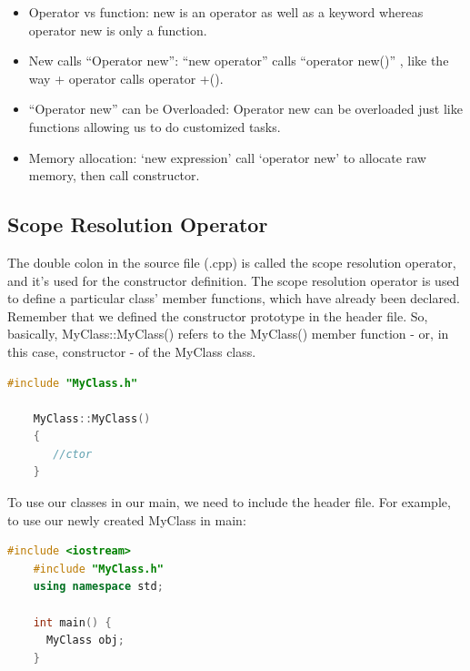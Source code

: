 \documentclass[12pt , a4paper]{article}
\begin{document}
	\begin{importantBox}
		\begin{itemize}
			\item Operator vs function: new is an operator as well as a keyword whereas operator new is only a function. \\
			\item New calls “Operator new”: “new operator” calls “operator new()” , like the way + operator calls operator +().\\
			\item “Operator new” can be Overloaded: Operator new can be overloaded just like functions allowing us to do customized tasks.\\
			\item Memory allocation: ‘new expression’ call ‘operator new’ to allocate raw memory, then call constructor.
		\end{itemize}
	\end{importantBox}
	\subsection{Scope Resolution Operator}
The double colon in the source file (.cpp) is called the scope resolution operator, and it's used for the constructor definition. The scope resolution operator is used to define a particular class' member functions, which have already been declared. Remember that we defined the constructor prototype in the header file. So, basically, MyClass::MyClass() refers to the MyClass() member function - or, in this case, constructor - of the MyClass class.
	\begin{lstlisting}[language=C++]
	#include "MyClass.h"
	
	MyClass::MyClass()
	{
	   //ctor
	}

	\end{lstlisting}
To use our classes in our main, we need to include the header file. For example, to use our newly created MyClass in main:
	\begin{lstlisting}[language=C++]
	#include <iostream>
	#include "MyClass.h"
	using namespace std;
	
	int main() {
	  MyClass obj;
	}

	\end{lstlisting}
\end{document}
